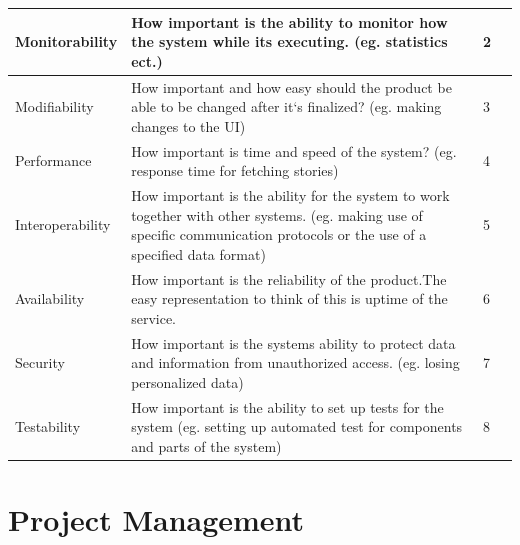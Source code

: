 \begin{appendices}
\begin{table}[!h]
\begin{tabular}{ | p{2.9cm} | p{9.5cm} | p{1.4cm} | p{2cm} | }
		Monitorability & How important is the ability to monitor how the system while its executing. (eg. statistics ect.) & 2 &  \\\hline		
		
		Modifiability & How important and how easy should the product be able to be changed after it`s finalized? (eg. making changes to the UI) & 3 &\\\hline
		
		Performance & How important is time and speed of the system? (eg. response time for fetching stories) & 4 &\\\hline
		
		Interoperability & How important is the ability for the system to work together with other systems. (eg. making use of specific communication protocols or the use of a specified data format) & 5 & 	\\\hline
		
		Availability & How important is the reliability of the product.The easy representation to think of this is uptime of the service. & 6 & \\\hline
	
		Security & How important is the systems ability to protect data and information from unauthorized access. (eg. losing personalized data) & 7 & \\\hline
		
		Testability & How important is the ability to set up tests for the system (eg. setting up automated test for components and parts of the system) & 8 &		\\\hline	
	\end{tabular}
\end{table}

\chapter{Project Management}
\label{app:project_managment} 

\end{appendices}
